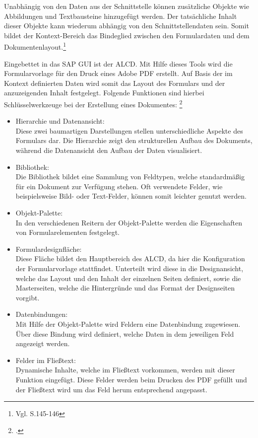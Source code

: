 Unabhängig von den Daten aus der Schnittstelle können zusätzliche Objekte wie Abbildungen und Textbausteine hinzugefügt werden. Der tatsächliche Inhalt dieser Objekte kann wiederum abhängig von den Schnittstellendaten sein. Somit bildet der Kontext-Bereich das Bindeglied zwischen den Formulardaten und dem Dokumentenlayout.\footnote{Vgl. \cite{Hauser.2015} S.145-146} 

Eingebettet in das SAP \ac{GUI} ist der \ac{ALCD}. Mit Hilfe dieses Tools wird die Formularvorlage für den Druck eines Adobe \ac{PDF} erstellt. Auf Basis der im Kontext definierten Daten wird somit das Layout des Formulars und der anzuzeigenden Inhalt festgelegt. Folgende Funktionen sind hierbei Schlüsselwerkzeuge bei der Erstellung eines Dokumentes: \footcite{Hauser.2015}

\begin{itemize}
	\item Hierarchie und Datenansicht: \\
		Diese zwei baumartigen Darstellungen stellen unterschiedliche Aspekte des Formulars dar. Die Hierarchie zeigt den strukturellen Aufbau des Dokuments, während die Datenansicht den Aufbau der Daten visualisiert.
	\item Bibliothek: \\
		Die Bibliothek bildet eine Sammlung von Feldtypen, welche standardmäßig für ein Dokument zur Verfügung stehen. Oft verwendete Felder, wie beispielsweise Bild- oder Text-Felder, können somit leichter genutzt werden.
	\item Objekt-Palette: \\
		In den verschiedenen Reitern der Objekt-Palette werden die Eigenschaften von Formularelementen festgelegt.
	\item Formulardesignfläche: \\
		Diese Fläche bildet den Hauptbereich des \ac{ALCD}, da hier die Konfiguration der Formularvorlage stattfindet. Unterteilt wird diese in die Designansicht, welche das Layout und den Inhalt der einzelnen Seiten definiert, sowie die Masterseiten, welche die Hintergründe und das Format der Designseiten vorgibt.
	\item Datenbindungen: \\
		Mit Hilfe der Objekt-Palette wird Feldern eine Datenbindung zugewiesen. Über diese Bindung wird definiert, welche Daten in dem jeweiligen Feld angezeigt werden.
	\item Felder im Fließtext: \\
		Dynamische Inhalte, welche im Fließtext vorkommen, werden mit dieser Funktion eingefügt. Diese Felder werden beim Drucken des \ac{PDF} gefüllt und der Fließtext wird um das Feld herum entsprechend angepasst.

\end{itemize}
